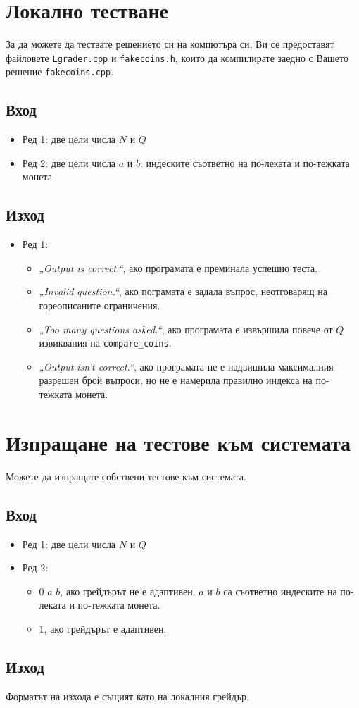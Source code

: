 \documentclass[a4paper,11pt]{article}
\newcommand{\code}[1]{\texttt{#1}}
\newcommand{\noskip}{\vspace{-\parskip}}
\begin{document}
\section*{Локално тестване}
За да можете да тествате решението си на компютъра си, Ви се предоставят
файловете \code{Lgrader.cpp} и \code{fakecoins.h}, които да компилирате
заедно с Вашето решение \code{fakecoins.cpp}.

\noskip
\subsection*{Вход}
\noskip
\begin{itemize}
    \item Ред 1: две цели числа $N$ и $Q$
    \item Ред 2: две цели числа $a$ и $b$: индеските съответно на по-леката и
        по-тежката монета.
\end{itemize}
\noskip
\subsection*{Изход}
\noskip
\begin{itemize}
    \item Ред 1:
    \begin{itemize}
        \item \textit{„Output is correct.“},
            ако програмата е преминала успешно теста.
        \item \textit{„Invalid question.“},
            ако пограмата е задала въпрос, неотговарящ на гореописаните
            ограничения.
        \item \textit{„Too many questions asked.“},
            ако програмата е извършила повече от $Q$ извиквания на
            \code{compare\_coins}.
        \item \textit{„Output isn't correct.“},
            ако програмата не е надвишила максималния разрешен брой въпроси, но
            не е намерила правилно индекса на по-тежката монета.
    \end{itemize}
\end{itemize}

\section*{Изпращане на тестове към системата}
Можете да изпращате собствени тестове към системата. 

\noskip
\subsection*{Вход}
\noskip
\begin{itemize}
    \item Ред 1: две цели числа $N$ и $Q$
    \item Ред 2: 
    \begin{itemize}
        \item $0$ $a$ $b$, ако грейдърът не е адаптивен.
            $a$ и $b$ са съответно индеските на по-леката и по-тежката монета.
        \item $1$, ако грейдърът е адаптивен.
    \end{itemize}
\end{itemize}
\noskip
\subsection*{Изход}
\noskip
Форматът на изхода е същият като на локалния грейдър.
\end{document}
